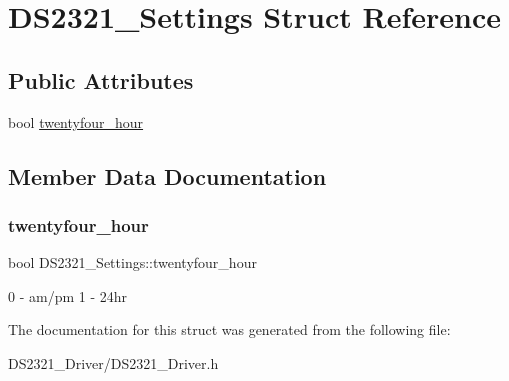 \hypertarget{structDS2321__Settings}{}\section{D\+S2321\+\_\+\+Settings Struct Reference}
\label{structDS2321__Settings}
\subsection*{Public Attributes}
\begin{DoxyCompactItemize}
\item 
bool \hyperlink{structDS2321__Settings_a46b5b91d51365eaf7bdd500a73fb75ee}{twentyfour\+\_\+hour}
\end{DoxyCompactItemize}


\subsection{Member Data Documentation}
\mbox{\label{structDS2321__Settings_a46b5b91d51365eaf7bdd500a73fb75ee}} 
\subsubsection{\texorpdfstring{twentyfour\+\_\+hour}{twentyfour\_hour}}
{\footnotesize\ttfamily bool D\+S2321\+\_\+\+Settings\+::twentyfour\+\_\+hour}

0 -\/ am/pm 1 -\/ 24hr 

The documentation for this struct was generated from the following file\+:\begin{DoxyCompactItemize}
\item 
D\+S2321\+\_\+\+Driver/D\+S2321\+\_\+\+Driver.\+h\end{DoxyCompactItemize}

